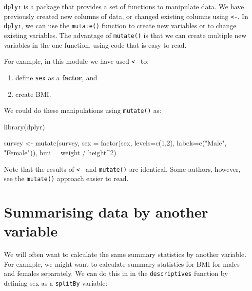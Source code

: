\documentclass[
  a4paper,
]{memoir}
\newenvironment{Shaded}{\begin{snugshade}}{\end{snugshade}}
\newcommand{\AttributeTok}[1]{\textcolor[rgb]{0.00,0.00,0.00}{#1}}
\newcommand{\DecValTok}[1]{\textcolor[rgb]{0.00,0.00,0.00}{#1}}
\newcommand{\FunctionTok}[1]{\textcolor[rgb]{0.00,0.00,0.00}{#1}}
\newcommand{\NormalTok}[1]{\textcolor[rgb]{0.00,0.00,0.00}{#1}}
\newcommand{\OtherTok}[1]{\textcolor[rgb]{0.00,0.00,0.00}{#1}}
\newcommand{\SpecialCharTok}[1]{\textcolor[rgb]{0.00,0.00,0.00}{#1}}
\newcommand{\StringTok}[1]{\textcolor[rgb]{0.00,0.00,0.00}{#1}}
\providecommand{\tightlist}{%
  \setlength{\itemsep}{0pt}\setlength{\parskip}{0pt}}
\begin{document}
\texttt{dplyr} is a package that provides a set of functions to
manipulate data. We have previously created new columns of data, or
changed existing columns using \texttt{\textless{}-}. In \texttt{dplyr},
we can use the \texttt{mutate()} function to create new variables or to
change existing variables. The advantage of \texttt{mutate()} is that we
can create multiple new variables in the one function, using code that
is easy to read.

For example, in this module we have used \texttt{\textless{}-} to:

\begin{enumerate}
\def\labelenumi{\arabic{enumi}.}
\tightlist
\item
  define \texttt{sex} as a \textbf{factor}, and
\item
  create BMI.
\end{enumerate}

We could do these manipulations using \texttt{mutate()} as:

\begin{Shaded}
\begin{Highlighting}[]
\FunctionTok{library}\NormalTok{(dplyr)}

\NormalTok{survey }\OtherTok{\textless{}{-}} \FunctionTok{mutate}\NormalTok{(survey, }\AttributeTok{sex =} \FunctionTok{factor}\NormalTok{(sex, }\AttributeTok{levels=}\FunctionTok{c}\NormalTok{(}\DecValTok{1}\NormalTok{,}\DecValTok{2}\NormalTok{), }\AttributeTok{labels=}\FunctionTok{c}\NormalTok{(}\StringTok{"Male"}\NormalTok{, }\StringTok{"Female"}\NormalTok{)),}
                         \AttributeTok{bmi =}\NormalTok{ weight }\SpecialCharTok{/}\NormalTok{ height}\SpecialCharTok{\^{}}\DecValTok{2}\NormalTok{)}
\end{Highlighting}
\end{Shaded}

Note that the results of \texttt{\textless{}-} and \texttt{mutate()} are
identical. Some authors, however, see the \texttt{mutate()} approach
easier to read.

\section{Summarising data by another
variable}\label{summarising-data-by-another-variable-1}

We will often want to calculate the same summary statistics by another
variable. For example, we might want to calculate summary statistics for
BMI for males and females separately. We can do this in in the
\texttt{descriptives} function by defining sex as a \texttt{splitBy}
variable:
\end{document}
